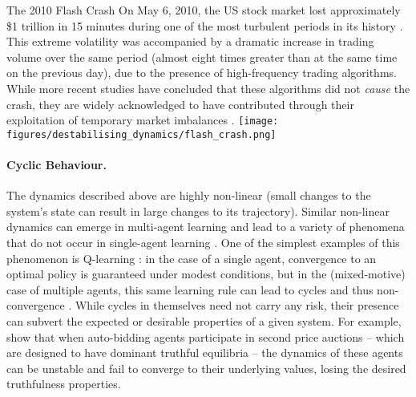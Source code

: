 \begin{case-study}[label=cs:flash_crash,sidebyside,sidebyside align=top,lower separated=false]{The 2010 Flash Crash}
  On May 6, 2010, the US stock market lost approximately \$1 trillion in 15 minutes during one of the most turbulent periods in its history \citep{CTFC2010}. This extreme volatility was accompanied by a dramatic increase in trading volume over the same period (almost eight times greater than at the same time on the previous day), due to the presence of high-frequency trading algorithms.\footnotemark{}
  While more recent studies have concluded that these algorithms did not \emph{cause} the crash, they are widely acknowledged to have contributed through their exploitation of temporary market imbalances \citep{Kirilenko2017}. 
  \tcblower
  \texttt{[image: figures/destabilising\_dynamics/flash\_crash.png]}
  \label{fig:flash_crash}
\end{case-study}



\paragraph{Cyclic Behaviour.} 
The dynamics described above are highly non-linear (small changes to the system's state can result in large changes to its trajectory).
Similar non-linear dynamics can emerge in multi-agent learning and lead to a variety of phenomena that do not occur in single-agent learning \citep{BarfussEtAl2019, NagarajanEtAl2020a, LeonardosEtAl2020, BarfussMann2022, GallaFarmer2013}.
One of the simplest examples of this phenomenon is Q-learning \citep{Watkins1992}: in the case of a single agent, convergence to an optimal policy is guaranteed under modest conditions, but in the (mixed-motive) case of multiple agents, this same learning rule can lead to {cycles} and thus non-convergence \citep{Zinkevich2005}. 
While cycles in themselves need not carry any risk, their presence can subvert the expected or desirable properties of a given system.
For example, \citet{PaesLeme2024} show that when auto-bidding agents participate in second price auctions -- which are designed to have dominant truthful equilibria -- the dynamics of these agents can be unstable and fail to converge to their underlying values, losing the desired truthfulness properties.


